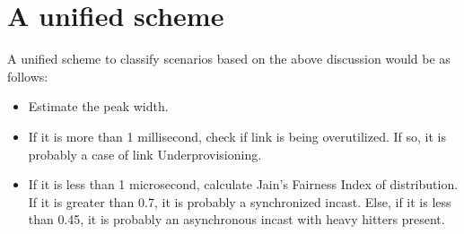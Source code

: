 \section{A unified scheme}

A unified scheme to classify scenarios based on the above discussion would be as follows:
\begin{itemize}
	\item Estimate the peak width.
	\item If it is more than 1 millisecond, check if link is being overutilized. If so, it is probably a case of link Underprovisioning.
	\item If it is less than 1 microsecond, calculate Jain's Fairness Index of distribution. If it is greater than 0.7, it is probably a synchronized incast. Else, if it is less than 0.45, it is probably
			an asynchronous incast with heavy hitters present.
\end{itemize}